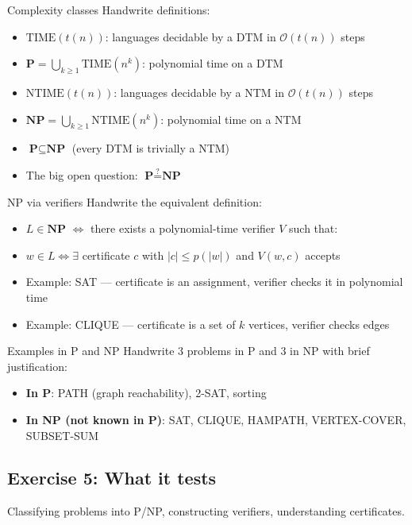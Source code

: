 \documentclass[11pt,a4paper]{article}
\begin{document}
\begin{writebox}{Complexity classes}
Handwrite definitions:
\begin{itemize}[nosep]
\item $\text{TIME}(t(n))$: languages decidable by a DTM in $\mathcal{O}(t(n))$ steps
\item $\textbf{P} = \bigcup_{k \geq 1} \text{TIME}(n^k)$: polynomial time on a DTM
\item $\text{NTIME}(t(n))$: languages decidable by a NTM in $\mathcal{O}(t(n))$ steps
\item $\textbf{NP} = \bigcup_{k \geq 1} \text{NTIME}(n^k)$: polynomial time on a NTM
\item $\textbf{P} \subseteq \textbf{NP}$ (every DTM is trivially a NTM)
\item The big open question: $\textbf{P} \stackrel{?}{=} \textbf{NP}$
\end{itemize}
\end{writebox}

\begin{writebox}{NP via verifiers}
Handwrite the equivalent definition:
\begin{itemize}[nosep]
\item $L \in \textbf{NP}$ $\iff$ there exists a polynomial-time verifier $V$ such that:
\item $w \in L \iff \exists$ certificate $c$ with $|c| \leq p(|w|)$ and $V(w,c)$ accepts
\item Example: SAT --- certificate is an assignment, verifier checks it in polynomial time
\item Example: CLIQUE --- certificate is a set of $k$ vertices, verifier checks edges
\end{itemize}
\end{writebox}

\begin{writebox}{Examples in P and NP}
Handwrite 3 problems in P and 3 in NP with brief justification:
\begin{itemize}[nosep]
\item \textbf{In P}: PATH (graph reachability), 2-SAT, sorting
\item \textbf{In NP (not known in P)}: SAT, CLIQUE, HAMPATH, VERTEX-COVER, SUBSET-SUM
\end{itemize}
\end{writebox}

\subsection*{Exercise 5: What it tests}
Classifying problems into P/NP, constructing verifiers, understanding certificates.
\end{document}
